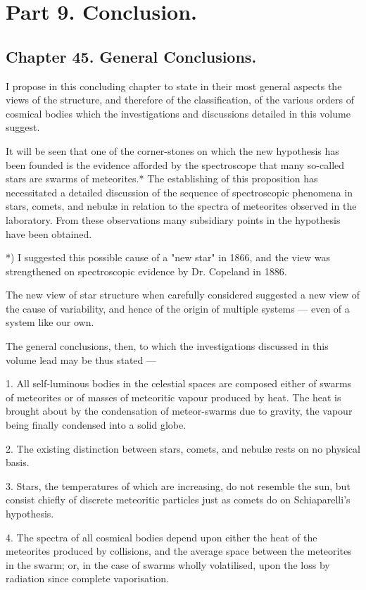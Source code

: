 \documentclass[a4paper, 12pt, oneside, polutonikogreek, english]{article}
\begin{document}
\section{Part 9. Conclusion.}

\subsection{Chapter 45. General Conclusions.}

I propose in this concluding chapter to state in their most general aspects the views of the structure, and therefore of the classification, of the various orders of cosmical bodies which the investigations and discussions detailed in this volume suggest.

It will be seen that one of the corner-stones on which the new hypothesis has been founded is the evidence afforded by the spectroscope that many so-called stars are swarms of meteorites.* The establishing of this proposition has necessitated a detailed discussion of the sequence of spectroscopic phenomena in stars, comets, and nebulæ in relation to the spectra of meteorites observed in the laboratory. From these observations many subsidiary points in the hypothesis have been obtained.

*) I suggested this possible cause of a "new star" in 1866, and the view was strengthened on spectroscopic evidence by Dr. Copeland in 1886.

The new view of star structure when carefully considered suggested a new view of the cause of variability, and hence of the origin of multiple systems --- even of a system like our own.

The general conclusions, then, to which the investigations discussed in this volume lead may be thus stated ---

1. All self-luminous bodies in the celestial spaces are composed either of swarms of meteorites or of masses of meteoritic vapour produced by heat. The heat is brought about by the condensation of meteor-swarms due to gravity, the vapour being finally condensed into a solid globe.

2. The existing distinction between stars, comets, and nebulæ rests on no physical basis.

3. Stars, the temperatures of which are increasing, do not resemble the sun, but consist chiefly of discrete meteoritic particles just as comets do on Schiaparelli's hypothesis.

4. The spectra of all cosmical bodies depend upon either the heat of the meteorites produced by collisions, and the average space between the meteorites in the swarm; or, in the case of swarms wholly volatilised, upon the loss by radiation since complete vaporisation.
\end{document}
